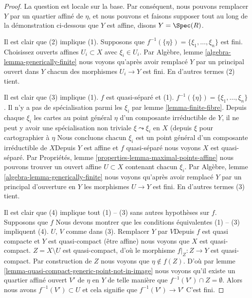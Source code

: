 \begin{proof}
La question est locale sur la base. Par conséquent, nous pouvons remplacer $Y$ par un quartier affiné de $\eta$, et nous pouvons et faisons supposer tout au long de la démonstration ci-dessous que $Y$ est affine, disons $Y = \Spec(R)$.

\medskip\noindent
Il est clair que (2) implique (1). Supposons que $f^{-1}(\{\eta\}) = \{\xi_1, \ldots, \xi_n\}$ est fini. Choisissez ouverts affines $U_i \subset X$ avec $\xi_i \in U_i$. Par Algèbre, lemme \ref{algebra-lemma-generically-finite} nous voyons qu'après avoir remplacé $Y$ par un principal ouvert dans $Y$ chacun des morphismes $U_i \to Y$ est fini. En d'autres termes (2) tient.

\medskip\noindent

Il est clair que (3) implique (1). $f$ est quasi-séparé et (1). $f^{-1}(\{\eta\}) = \{\xi_1, \ldots, \xi_n\}$. Il n'y a pas de spécialisation parmi les $\xi_i$ par lemme \ref{lemma-finite-fibre}. Depuis chaque $\xi_i$ les cartes au point général $\eta$ d'un composante irréductible de $Y$, il ne peut y avoir une spécialisation non triviale $\xi \leadsto \xi_i$ en $X$
(depuis $\xi$ pour cartographier à $\eta$ Nous concluons chacun $\xi_i$ est un point général d'un composante irréductible de $X$Depuis $Y$ est affine et $f$ quasi-séparé nous voyons $X$ est quasi-séparé. Par Propriétés, lemme \ref{properties-lemma-maximal-points-affine}
nous pouvons trouver un ouvert affine $U \subset X$ contenant chacun $\xi_i$. Par Algèbre, lemme \ref{algebra-lemma-generically-finite} nous voyons qu'après avoir remplacé $Y$ par un principal d'ouverture en
$Y$ les morphismes $U \to Y$ est fini. En d'autres termes (3) tient.

\medskip\noindent

Il est clair que (4) implique tout (1) -- (3) sans autres hypothèses sur $f$. Supposons que $f$ Nous devons montrer que les conditions équivalentes (1) -- (3) impliquent (4). $U$, $V$ comme dans (3). Remplacer $Y$ par $V$Depuis $f$ est quasi compacte et $Y$ est quasi-compact (être affine) nous voyons que $X$ est quasi-compact. $Z = X \setminus U$ est quasi-compact, d'où le morphisme
$f|_Z : Z \to Y$ est quasi-compact. Par construction de $Z$ nous voyons que
$\eta \not \in f(Z)$. D'où par lemme \ref{lemma-quasi-compact-generic-point-not-in-image}
nous voyons qu'il existe un quartier affiné ouvert $V'$ de $\eta$ en $Y$ de telle manière que $f^{-1}(V') \cap Z = \emptyset$. Alors nous avons $f^{-1}(V') \subset U$ et cela signifie que $f^{-1}(V') \to V'$ C'est fini.

\end{proof}

